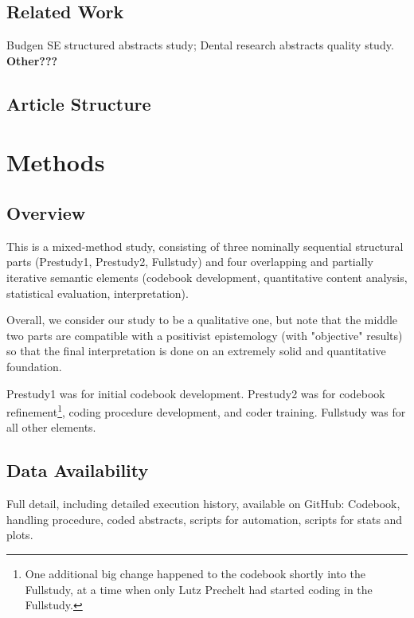 \documentclass[10pt,journal,compsoc]{IEEEtran}
\newcommand{\Todo}[1]{\bgroup\bf\Large #1\egroup}
\begin{document}
\subsection{Related Work}

Budgen SE structured abstracts study; Dental research abstracts quality study.
\Todo{Other???}


\subsection{Article Structure}



\section{Methods}


\subsection{Overview}

\noindent
This is a mixed-method study, consisting of three nominally sequential structural parts
(Prestudy1, Prestudy2, Fullstudy) and
four overlapping and partially iterative semantic elements
(codebook development, quantitative content analysis,
statistical evaluation, interpretation).

Overall, we consider our study to be a qualitative one, but note that the middle two parts
are compatible with a positivist epistemology (with "objective" results) so that 
the final interpretation is done on an extremely solid and quantitative foundation.

Prestudy1 was for initial codebook development.
Prestudy2 was for codebook refinement\footnote{One additional big change happened
	to the codebook shortly into the Fullstudy, at a time when only Lutz Prechelt
	had started coding in the Fullstudy.},
coding procedure development,
and coder training.
Fullstudy was for all other elements.


\subsection{Data Availability}

\noindent
Full detail, including detailed execution history, available on GitHub:
Codebook, handling procedure, coded abstracts, scripts for automation, scripts for stats and plots.
\end{document}
